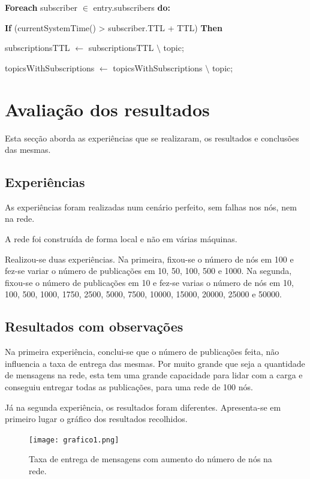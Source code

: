 \documentclass[12pt]{article}
\begin{document}
\qquad \qquad \textbf{Foreach} subscriber $\in$ entry.subscribers \textbf{do:}

\qquad \qquad \qquad \textbf{If} (currentSystemTime() > subscriber.TTL + TTL) \textbf{Then}

\qquad \qquad \qquad \qquad subscriptionsTTL $\leftarrow$ subscriptionsTTL $\setminus$ {topic};

\qquad \qquad \qquad \qquad topicsWithSubscriptions $\leftarrow$ topicsWithSubscriptions $\setminus$ {topic};





\newpage
\section{Avaliação dos resultados}

Esta secção aborda as experiências que se realizaram, os resultados e conclusões das mesmas.

\subsection{Experiências}

As experiências foram realizadas num cenário perfeito, sem falhas nos nós, nem na rede.

A rede foi construída de forma local e não em várias máquinas.

Realizou-se duas experiências. Na primeira, fixou-se o número de nós em 100 e fez-se variar o número de publicações em 10, 50, 100, 500 e 1000. Na segunda, fixou-se o número de publicações em 10 e fez-se varias o número de nós em 10, 100, 500, 1000, 1750, 2500, 5000, 7500, 10000, 15000, 20000, 25000 e 50000.

\subsection{Resultados com observações}

Na primeira experiência, conclui-se que o número de publicações feita, não influencia a taxa de entrega das mesmas. Por muito grande que seja a quantidade de mensagens na rede, esta tem uma grande capacidade para lidar com a carga e conseguiu entregar todas as publicações, para uma rede de 100 nós.

Já na segunda experiência, os resultados foram diferentes. Apresenta-se em primeiro lugar o gráfico dos resultados recolhidos.

\begin{figure}[htbp]
	\centering
	\texttt{[image: grafico1.png]}
	\caption{Taxa de entrega de mensagens com aumento do número de nós na rede.}
	\label{fig:graf1}
\end{figure}
\end{document}

